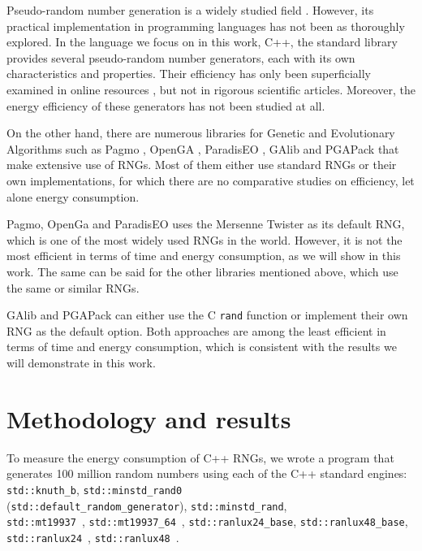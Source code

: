 \documentclass[dvipsnames,format=sigconf,anonymous=true,review=true]{acmart}
\begin{document}
Pseudo-random number generation is a widely studied field \cite{marsaglia2003random}. However, its practical implementation in programming languages has not been as thoroughly explored. In the language we focus on in this work, C++, the standard library provides several pseudo-random number generators, each with its own characteristics and properties. Their efficiency has only been superficially examined in online resources \cite{kd9f9-2020,arbelaez-2016}, but not in rigorous scientific articles. Moreover, the energy efficiency of these generators has not been studied at all.

On the other hand, there are numerous libraries for Genetic and Evolutionary Algorithms such as Pagmo \cite{Biscani2020}, OpenGA \cite{8122921}, ParadisEO \cite{Dreo-al_2021_Paradiseo}, GAlib \cite{wall1996galib} and PGAPack \cite{levine1996users} that make extensive use of RNGs. Most of them either use standard RNGs or their own implementations, for which there are no comparative studies on efficiency, let alone energy consumption.

Pagmo, OpenGa and ParadisEO uses the Mersenne Twister \cite{mersennetwister} as its default RNG, which is one of the most widely used RNGs in the world. However, it is not the most efficient in terms of time and energy consumption, as we will show in this work. The same can be said for the other libraries mentioned above, which use the same or similar RNGs.

GAlib and PGAPack can either use the C \texttt{rand} function or implement their own RNG as the default option. Both approaches are among the least efficient in terms of time and energy consumption, which is consistent with the results we will demonstrate in this work.

\section{Methodology and results}
\label{sec:methodology}

To measure the energy consumption of C++ RNGs, we wrote a program that generates 100 million random numbers using each of the C++ standard engines: \texttt{std::knuth\_b},  \texttt{std::minstd\_rand0} \\(\texttt{std::default\_random\_generator}),  \texttt{std::minstd\_rand}, \\ \texttt{std::mt19937}~\cite{mersennetwister},  \texttt{std::mt19937\_64}~\cite{mersennetwister}, \texttt{std::ranlux24\_base}, \texttt{std::ranlux48\_base},  \texttt{std::ranlux24}~\cite{JAMES1994111}, \texttt{std::ranlux48}~\cite{JAMES1994111}.
\end{document}
